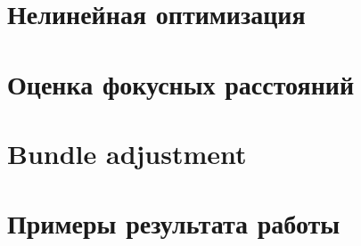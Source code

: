 \chapter{Нелинейная оптимизация}


\chapter{Оценка фокусных расстояний}


\chapter{Bundle adjustment}


\chapter{Примеры результата работы}






